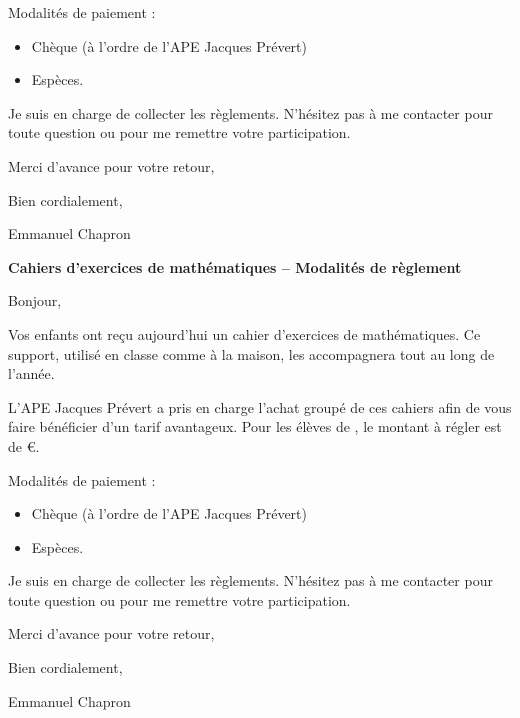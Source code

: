 \documentclass[a4paper]{book}
\begin{document}
    Modalités de paiement :
    \begin{itemize}
        \item Chèque (à l’ordre de l’APE Jacques Prévert)
        \item Espèces.
    \end{itemize}

    \medskip
    
    Je suis en charge de collecter les règlements. N’hésitez pas à me contacter pour toute question ou pour me remettre votre participation.
    
    Merci d’avance pour votre retour,
    
    Bien cordialement,
    
    Emmanuel Chapron
    

    \vspace{2cm}
    

    \textbf{Cahiers d’exercices de mathématiques – Modalités de règlement}
    
    Bonjour,

    \medskip
    
    Vos enfants ont reçu aujourd’hui un cahier d’exercices de mathématiques. Ce support, utilisé en classe comme à la maison, les accompagnera tout au long de l’année.

    \medskip

    L’APE Jacques Prévert a pris en charge l’achat groupé de ces cahiers afin de vous faire bénéficier d’un tarif avantageux. Pour les élèves de \classe, le montant à régler est de \montant €.
    
    \medskip

    Modalités de paiement :
    \begin{itemize}
        \item Chèque (à l’ordre de l’APE Jacques Prévert)
        \item Espèces.
    \end{itemize}

    \medskip
    
    Je suis en charge de collecter les règlements. N’hésitez pas à me contacter pour toute question ou pour me remettre votre participation.
    
    Merci d’avance pour votre retour,
    
    Bien cordialement,
    
    Emmanuel Chapron
\end{document}
